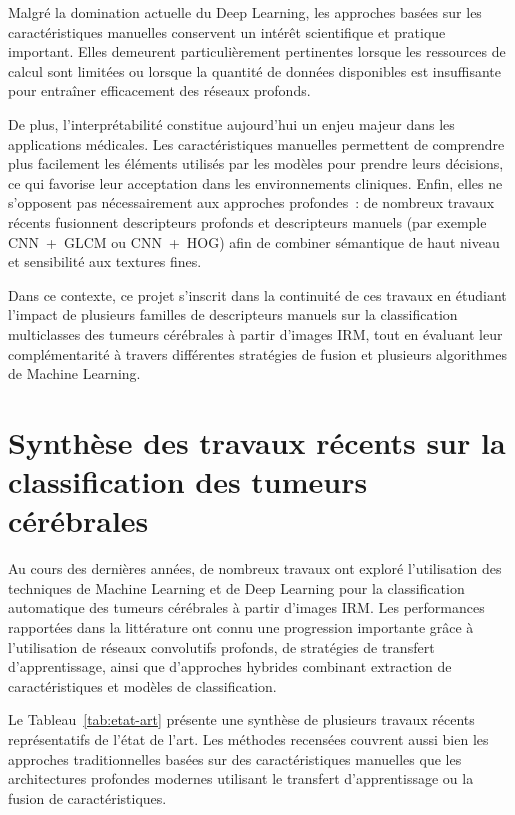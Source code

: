 Malgré la domination actuelle du Deep Learning, les approches basées sur les
caractéristiques manuelles conservent un intérêt scientifique et pratique important. Elles
demeurent particulièrement pertinentes lorsque les ressources de calcul sont limitées ou
lorsque la quantité de données disponibles est insuffisante pour entraîner efficacement des
réseaux profonds.

De plus, l'interprétabilité constitue aujourd'hui un enjeu majeur dans les applications
médicales. Les caractéristiques manuelles permettent de comprendre plus facilement les
éléments utilisés par les modèles pour prendre leurs décisions, ce qui favorise leur
acceptation dans les environnements cliniques. Enfin, elles ne s'opposent pas nécessairement
aux approches profondes~: de nombreux travaux récents fusionnent descripteurs profonds et
descripteurs manuels (par exemple CNN~+~GLCM ou CNN~+~HOG) afin de combiner sémantique de haut
niveau et sensibilité aux textures fines.

Dans ce contexte, ce projet s'inscrit dans la continuité de ces travaux en étudiant l'impact
de plusieurs familles de descripteurs manuels sur la classification multiclasses des tumeurs
cérébrales à partir d'images IRM, tout en évaluant leur complémentarité à travers différentes
stratégies de fusion et plusieurs algorithmes de Machine Learning.

\section{Synthèse des travaux récents sur la classification des tumeurs cérébrales}

Au cours des dernières années, de nombreux travaux ont exploré l'utilisation des techniques
de Machine Learning et de Deep Learning pour la classification automatique des tumeurs
cérébrales à partir d'images IRM. Les performances rapportées dans la littérature ont connu
une progression importante grâce à l'utilisation de réseaux convolutifs profonds, de stratégies
de transfert d'apprentissage, ainsi que d'approches hybrides combinant extraction de
caractéristiques et modèles de classification.

Le Tableau~\ref{tab:etat-art} présente une synthèse de plusieurs travaux récents
représentatifs de l'état de l'art. Les méthodes recensées couvrent aussi bien les approches
traditionnelles basées sur des caractéristiques manuelles que les architectures profondes
modernes utilisant le transfert d'apprentissage ou la fusion de caractéristiques.

